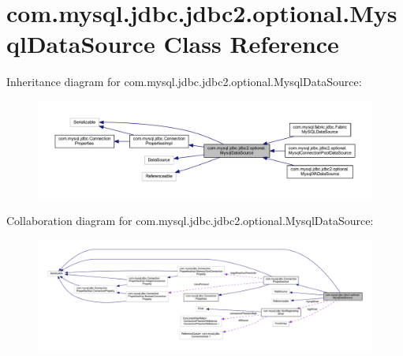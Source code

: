 \hypertarget{classcom_1_1mysql_1_1jdbc_1_1jdbc2_1_1optional_1_1_mysql_data_source}{}\section{com.\+mysql.\+jdbc.\+jdbc2.\+optional.\+Mysql\+Data\+Source Class Reference}
\label{classcom_1_1mysql_1_1jdbc_1_1jdbc2_1_1optional_1_1_mysql_data_source}


Inheritance diagram for com.\+mysql.\+jdbc.\+jdbc2.\+optional.\+Mysql\+Data\+Source\+:
\nopagebreak
\begin{figure}[H]
\begin{center}
\leavevmode
\includegraphics[width=350pt]{classcom_1_1mysql_1_1jdbc_1_1jdbc2_1_1optional_1_1_mysql_data_source__inherit__graph}
\end{center}
\end{figure}


Collaboration diagram for com.\+mysql.\+jdbc.\+jdbc2.\+optional.\+Mysql\+Data\+Source\+:
\nopagebreak
\begin{figure}[H]
\begin{center}
\leavevmode
\includegraphics[width=350pt]{classcom_1_1mysql_1_1jdbc_1_1jdbc2_1_1optional_1_1_mysql_data_source__coll__graph}
\end{center}
\end{figure}
